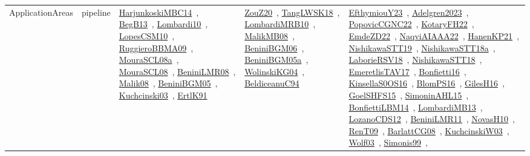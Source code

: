 {\begin{longtable}{lp{3cm}>{\raggedright\arraybackslash}p{6cm}>{\raggedright\arraybackslash}p{6cm}>{\raggedright\arraybackslash}p{8cm}}
\index{pipeline}\index{ApplicationAreas!pipeline}ApplicationAreas & pipeline & \href{../works/HarjunkoskiMBC14.pdf}{HarjunkoskiMBC14}~\cite{HarjunkoskiMBC14}, \href{../works/BegB13.pdf}{BegB13}~\cite{BegB13}, \href{../works/Lombardi10.pdf}{Lombardi10}~\cite{Lombardi10}, \href{../works/LopesCSM10.pdf}{LopesCSM10}~\cite{LopesCSM10}, \href{../works/RuggieroBBMA09.pdf}{RuggieroBBMA09}~\cite{RuggieroBBMA09}, \href{../works/MouraSCL08a.pdf}{MouraSCL08a}~\cite{MouraSCL08a}, \href{../works/MouraSCL08.pdf}{MouraSCL08}~\cite{MouraSCL08}, \href{../works/BeniniLMR08.pdf}{BeniniLMR08}~\cite{BeniniLMR08}, \href{../works/Malik08.pdf}{Malik08}~\cite{Malik08}, \href{../works/BeniniBGM05.pdf}{BeniniBGM05}~\cite{BeniniBGM05}, \href{../works/Kuchcinski03.pdf}{Kuchcinski03}~\cite{Kuchcinski03}, \href{../works/ErtlK91.pdf}{ErtlK91}~\cite{ErtlK91} & \href{../works/ZouZ20.pdf}{ZouZ20}~\cite{ZouZ20}, \href{../works/TangLWSK18.pdf}{TangLWSK18}~\cite{TangLWSK18}, \href{../works/LombardiMRB10.pdf}{LombardiMRB10}~\cite{LombardiMRB10}, \href{../works/MalikMB08.pdf}{MalikMB08}~\cite{MalikMB08}, \href{../works/BeniniBGM06.pdf}{BeniniBGM06}~\cite{BeniniBGM06}, \href{../works/BeniniBGM05a.pdf}{BeniniBGM05a}~\cite{BeniniBGM05a}, \href{../works/WolinskiKG04.pdf}{WolinskiKG04}~\cite{WolinskiKG04}, \href{../works/BeldiceanuC94.pdf}{BeldiceanuC94}~\cite{BeldiceanuC94} & \href{../works/EfthymiouY23.pdf}{EfthymiouY23}~\cite{EfthymiouY23}, \href{../works/Adelgren2023.pdf}{Adelgren2023}~\cite{Adelgren2023}, \href{../works/PopovicCGNC22.pdf}{PopovicCGNC22}~\cite{PopovicCGNC22}, \href{../works/KotaryFH22.pdf}{KotaryFH22}~\cite{KotaryFH22}, \href{../works/EmdeZD22.pdf}{EmdeZD22}~\cite{EmdeZD22}, \href{../works/NaqviAIAAA22.pdf}{NaqviAIAAA22}~\cite{NaqviAIAAA22}, \href{../works/HanenKP21.pdf}{HanenKP21}~\cite{HanenKP21}, \href{../works/NishikawaSTT19.pdf}{NishikawaSTT19}~\cite{NishikawaSTT19}, \href{../works/NishikawaSTT18a.pdf}{NishikawaSTT18a}~\cite{NishikawaSTT18a}, \href{../works/LaborieRSV18.pdf}{LaborieRSV18}~\cite{LaborieRSV18}, \href{../works/NishikawaSTT18.pdf}{NishikawaSTT18}~\cite{NishikawaSTT18}, \href{../works/EmeretlisTAV17.pdf}{EmeretlisTAV17}~\cite{EmeretlisTAV17}, \href{../works/Bonfietti16.pdf}{Bonfietti16}~\cite{Bonfietti16}, \href{../works/KinsellaS0OS16.pdf}{KinsellaS0OS16}~\cite{KinsellaS0OS16}, \href{../works/BlomPS16.pdf}{BlomPS16}~\cite{BlomPS16}, \href{../works/GilesH16.pdf}{GilesH16}~\cite{GilesH16}, \href{../works/GoelSHFS15.pdf}{GoelSHFS15}~\cite{GoelSHFS15}, \href{../works/SimoninAHL15.pdf}{SimoninAHL15}~\cite{SimoninAHL15}, \href{../works/BonfiettiLBM14.pdf}{BonfiettiLBM14}~\cite{BonfiettiLBM14}, \href{../works/LombardiMB13.pdf}{LombardiMB13}~\cite{LombardiMB13}, \href{../works/LozanoCDS12.pdf}{LozanoCDS12}~\cite{LozanoCDS12}, \href{../works/BeniniLMR11.pdf}{BeniniLMR11}~\cite{BeniniLMR11}, \href{../works/NovasH10.pdf}{NovasH10}~\cite{NovasH10}, \href{../works/RenT09.pdf}{RenT09}~\cite{RenT09}, \href{../works/BarlattCG08.pdf}{BarlattCG08}~\cite{BarlattCG08}, \href{../works/KuchcinskiW03.pdf}{KuchcinskiW03}~\cite{KuchcinskiW03}, \href{../works/Wolf03.pdf}{Wolf03}~\cite{Wolf03}, \href{../works/Simonis99.pdf}{Simonis99}~\cite{Simonis99}, 
\end{longtable}}

